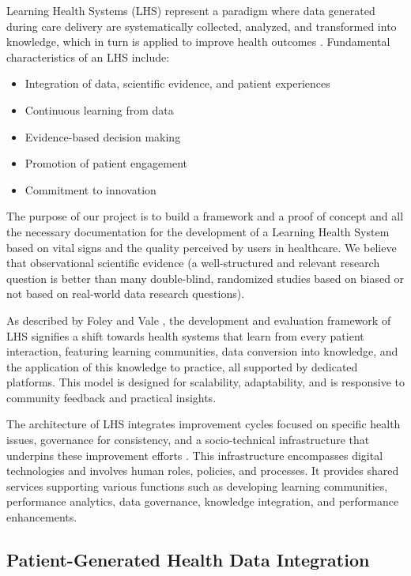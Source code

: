 Learning Health Systems (LHS) represent a paradigm where data generated during care delivery are systematically collected, analyzed, and transformed into knowledge, which in turn is applied to improve health outcomes \cite{IOM2007}. Fundamental characteristics of an LHS include:

\begin{itemize}
\item Integration of data, scientific evidence, and patient experiences
\item Continuous learning from data
\item Evidence-based decision making
\item Promotion of patient engagement
\item Commitment to innovation
\end{itemize}

The purpose of our project is to build a framework and a proof of concept and all the necessary documentation for the development of a Learning Health System based on vital signs and the quality perceived by users in healthcare. We believe that observational scientific evidence (a well-structured and relevant research question is better than many double-blind, randomized studies based on biased or not based on real-world data research questions).

As described by Foley and Vale \cite{foley2023framework}, the development and evaluation framework of LHS signifies a shift towards health systems that learn from every patient interaction, featuring learning communities, data conversion into knowledge, and the application of this knowledge to practice, all supported by dedicated platforms. This model is designed for scalability, adaptability, and is responsive to community feedback and practical insights.

The architecture of LHS integrates improvement cycles focused on specific health issues, governance for consistency, and a socio-technical infrastructure that underpins these improvement efforts \cite{friedman2024socio}. This infrastructure encompasses digital technologies and involves human roles, policies, and processes. It provides shared services supporting various functions such as developing learning communities, performance analytics, data governance, knowledge integration, and performance enhancements.

\subsection{Patient-Generated Health Data Integration}

